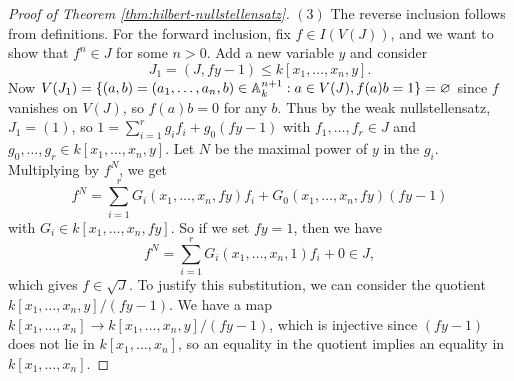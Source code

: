\begin{proof}[Proof of Theorem \ref{thm:hilbert-nullstellensatz}]
  $(3)$ The reverse inclusion follows
  from definitions. For the forward
  inclusion, fix $f \in I(V(J))$, and
  we want to show that $f^n \in J$ for
  some $n > 0$. Add a new variable $y$
  and consider
  \[
    J_1 = (J, fy - 1) \le k[x_1, \dots, x_n, y].
  \]
  Now $V(J_1) = \{(a, b) = (a_1, \dots, a_n, b) \in \mathbb{A}_k^{n + 1} : a \in V(J), f(a) b = 1\} = \varnothing$
  since $f$ vanishes on $V(J)$, so
  $f(a) b = 0$ for any $b$. Thus by the
  weak nullstellensatz, $J_1 = (1)$, so
  $1 = \sum_{i = 1}^r g_i f_i + g_0(fy - 1)$
  with $f_1, \dots, f_r \in J$
  and $g_0, \dots, g_r \in k[x_1, \dots, x_n, y]$. Let $N$ be the maximal power
  of $y$ in the $g_i$. Multiplying by
  $f^N$, we get
  \[
    f^N = \sum_{i = 1}^r G_i(x_1, \dots, x_n, fy) f_i + G_0(x_1, \dots, x_n, fy)(fy - 1)
  \]
  with $G_i \in k[x_1, \dots, x_n, fy]$.
  So if we set $fy = 1$, then we have
  \[
    f^N = \sum_{i = 1}^r G_i(x_1, \dots, x_n, 1) f_i + 0 \in J,
  \]
  which gives $f \in \sqrt{J}$. To
  justify this substitution, we can
  consider the quotient
  $k[x_1, \dots, x_n, y] / (fy - 1)$.
  We have a map
  $k[x_1, \dots, x_n] \to k[x_1, \dots, x_n, y] / (fy - 1)$,
  which is injective since $(fy - 1)$
  does not lie in $k[x_1, \dots, x_n]$,
  so an equality in the quotient implies
  an equality in $k[x_1, \dots, x_n]$.
\end{proof}
